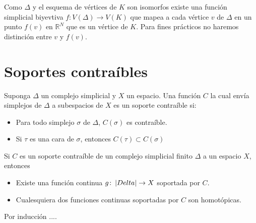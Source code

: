 Como $\Delta$ y el esquema de vértices de $K$ son isomorfos existe una función simplicial biyevtiva $f\colon V(\Delta)\rightarrow V(K)$ que mapea a cada vértice $v$ de $\Delta$ en un punto $f(v)$ en $\mathbb{R}^N$ que es un vértice de $K$. Para fines prácticos no haremos distinción entre $v$ y $f(v)$.

\section{Soportes contraíbles}
\begin{Defi}
Suponga $\Delta$ un complejo simplicial y $X$ un espacio. Una función $C$ la cual envía simplejos de $\Delta$ a subespacios de $X$ es un soporte contraíble si:
\begin{itemize}
\item Para todo simplejo $\sigma$ de $\Delta$, $C(\sigma)$ es contraíble.
\item Si $\tau$ es una cara de $\sigma$, entonces $C(\tau)\subset C(\sigma)$
\end{itemize}
\end{Defi}

\begin{Teo}
Si $C$ es un soporte contraíble de un complejo simplicial finito $\Delta$ a un espacio $X$, entonces
\begin{itemize}
\item Existe una función continua $g\colon \left| Delta \right|\rightarrow X$ soportada por $C$.
\item Cualesquiera dos funciones continuas soportadas por $C$ son homotópicas.
\end{itemize}
\end{Teo}
\begin{Dem}

Por inducción ....
\end{Dem}